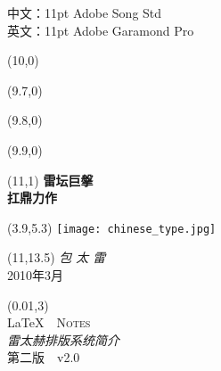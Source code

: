
\newpage
\thispagestyle{empty}
\vspace*{\fill}
\begin{center}
中文：11pt Adobe Song Std\\
英文：11pt Adobe Garamond Pro
\end{center}
\vspace{\fill}

\begin{titlepage}

\setlength\parindent{0pt}


\begin{textblock}{6}(10,0)
    \rule{0mm}{420mm}
\end{textblock}

\begin{textblock}{.02}(9.7,0)
    \rule{0mm}{420mm}
\end{textblock}

\begin{textblock}{.02}(9.8,0)
    \rule{0mm}{420mm}
\end{textblock}

\begin{textblock}{.02}(9.9,0)
    \rule{0mm}{420mm}
\end{textblock}

\begin{textblock}{3}(11,1)
    {\Huge \textbf{雷坛巨搫}\\[5pt] \textbf{扛鼎力作}}
\end{textblock}

\begin{textblock}{12.8}(3.9,5.3)
\textblockcolour{}
    \texttt{[image: chinese\_type.jpg]}
\end{textblock}

\begin{textblock}{4}(11,13.5)
    {\huge \textit{包 太 雷}}\\[5pt]
    {\Large 2010年3月}
\end{textblock}

\TPshowboxestrue
\setlength\TPboxrulesize{0.8pt}

\begin{textblock}{14}(0.01,3)
    \centering
    ~\\[20pt]
    {\fontsize{32}{40}\selectfont \LaTeX\ \ \textsc{Notes}}\\[8pt]
    {\huge \textit{雷太赫排版系统简介}}\\[8pt]
    第二版\ \ v2.0\\[20pt]
\end{textblock}
~
\end{titlepage}
